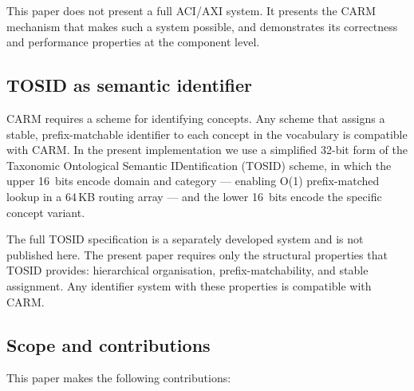 \documentclass[11pt,a4paper]{article}
\theoremstyle{definition}
\begin{document}
This paper does not present a full ACI/AXI system. It presents the CARM mechanism
that makes such a system possible, and demonstrates its correctness and performance
properties at the component level.

\subsection{TOSID as semantic identifier}

CARM requires a scheme for identifying concepts. Any scheme that assigns a stable,
prefix-matchable identifier to each concept in the vocabulary is compatible with
CARM. In the present implementation we use a simplified 32-bit form of the
Taxonomic Ontological Semantic IDentification (TOSID) scheme, in which the upper
16~bits encode domain and category --- enabling O(1) prefix-matched lookup in a
64\,KB routing array --- and the lower 16~bits encode the specific concept variant.

The full TOSID specification is a separately developed system and is not published
here. The present paper requires only the structural properties that TOSID provides:
hierarchical organisation, prefix-matchability, and stable assignment. Any identifier
system with these properties is compatible with CARM.

\subsection{Scope and contributions}

This paper makes the following contributions:
\end{document}
